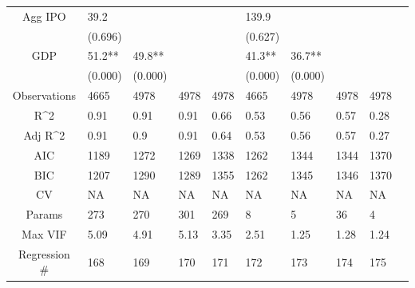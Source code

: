 \documentclass{article}
\begin{document}
\begin{table}[H]
\begin{tabular}{|clllllllll|}
  Agg IPO & 39.2 &  &  &  & 139.9 &  &  &  & \\
   & (0.696) &  &  &  & (0.627) &  &  &  & \\
  GDP & 51.2** & 49.8** &  &  & 41.3** & 36.7** &  &  & \\
   & (0.000) & (0.000) &  &  & (0.000) & (0.000) &  &  & \\
  \hline
 Observations & 4665 & 4978 & 4978 & 4978 & 4665 & 4978 & 4978 & 4978 & \\
  R^2 & 0.91 & 0.91 & 0.91 & 0.66 & 0.53 & 0.56 & 0.57 & 0.28 & \\
  Adj R^2 & 0.91 & 0.9 & 0.91 & 0.64 & 0.53 & 0.56 & 0.57 & 0.27 & \\
  AIC & 1189 & 1272 & 1269 & 1338 & 1262 & 1344 & 1344 & 1370 & \\
  BIC & 1207 & 1290 & 1289 & 1355 & 1262 & 1345 & 1346 & 1370 & \\
  CV & NA & NA & NA & NA & NA & NA & NA & NA & \\
  Params & 273 & 270 & 301 & 269 & 8 & 5 & 36 & 4 & \\
  Max VIF & 5.09 & 4.91 & 5.13 & 3.35 & 2.51 & 1.25 & 1.28 & 1.24 & \\
  Regression \# & 168 & 169 & 170 & 171 & 172 & 173 & 174 & 175 & \\
   \hline
\end{tabular}

\end{table}
\end{document}
